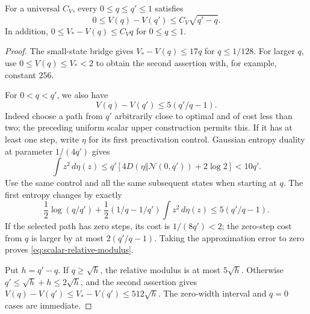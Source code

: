 \begin{lemma}
\label{lem:scalar-value-modulus}
For a universal $C_V$, every $0\le q\le q'\le1$ satisfies
\[
 0\le V(q)-V(q')\le C_V\sqrt{q'-q}.
\]
In addition, $0\le V_*-V(q)\le C_Vq$ for $0\le q\le1$.
\end{lemma}
\begin{proof}
The small-state bridge gives $V_*-V(q)\le17q$ for $q\le1/128$.
For larger $q$, use $0\le V(q)\le V_*<2$ to obtain the second
assertion with, for example, constant $256$.

For $0<q<q'$, we also have
\begin{equation}\label{eq:scalar-relative-modulus}
 V(q)-V(q')\le5(q'/q-1).
\end{equation}
Indeed choose a path from $q'$ arbitrarily close to optimal and of
cost less than two; the preceding uniform scalar upper construction
permits this. If it has at least one step, write $\eta$ for its first
preactivation control. Gaussian entropy duality at parameter
$1/(4q')$ gives
\[
 \int z^2\,d\eta(z)
 \le q'\left[4D(\eta\Vert\mathcal N(0,q'))+2\log2\right]
 <10q'.
\]
Use the same control and all the same subsequent states when starting
at $q$. The first entropy changes by exactly
\[
 \frac12\log(q/q')+
  \frac12(1/q-1/q')\int z^2\,d\eta(z)
 \le5(q'/q-1).
\]
If the selected path has zero steps, its cost is $1/(8q')<2$;
the zero-step cost from $q$ is larger by at most
$2(q'/q-1)$. Taking the approximation error to zero proves
\eqref{eq:scalar-relative-modulus}.

Put $h=q'-q$. If $q\ge\sqrt h$, the relative modulus is at most
$5\sqrt h$. Otherwise $q'\le\sqrt h+h\le2\sqrt h$, and the second
assertion gives
$V(q)-V(q')\le V_*-V(q')\le512\sqrt h$.
The zero-width interval and $q=0$ cases are immediate.
\end{proof}

